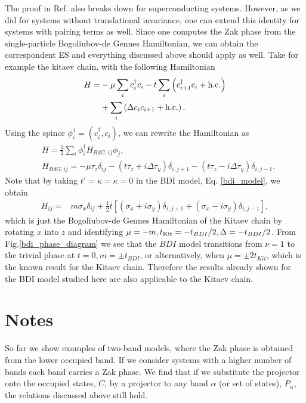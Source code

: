\documentclass[twocolumn,amsmath,longbibliography,amssymb,superscriptaddress]{revtex4-1}
\begin{document}
The proof in Ref.\cite{Zaletel2014} also breaks down for superconducting systems. However, as we did for systems without translational invariance, one can extend this identity for systems with pairing terms as well. Since one computes the Zak phase from the single-particle Bogoliubov-de Gennes Hamiltonian, we can obtain the correspondent ES and everything discussed above should apply as well. Take for example the kitaev chain, with the following Hamiltonian
\begin{align*}
H =& -\mu \sum_{i} c_i^\dagger c_i - t \sum_{i}\left( c_{i+1}^\dagger c_i + {\rm h.c.}\right) \\
&+  \sum_{i}\left( \Delta c_{i} c_{i+1} + {\rm h.c.}\right).
\end{align*}
Using the spinor $\phi_i^\dagger = (c_i^\dagger, c_i)$, we can rewrite the Hamiltonian as
\begin{align*}
&H = \frac{1}{2}\sum_i \phi^\dagger_i H_{BdG,ij} \phi_j,\\
&H_{BdG,ij} = -\mu \tau_z \delta_{ij} - (t \tau_z + i\Delta \tau_y )\delta_{i,j+1}- (t \tau_z - i\Delta \tau_y)\delta_{i,j-1}.
\end{align*}
Note that by taking $t' = \kappa = \kappa = 0$ in the BDI model, Eq. \ref{bdi_model}, we obtain
\begin{align*}
H_{ij} =& m \sigma_x\delta_{ij} + \frac{1}{2} t \left[(\sigma_x + i \sigma_y)\delta_{i,j+1} + (\sigma_x - i \sigma_y) \delta_{i,j-1} \right],
\end{align*}
which is just the Bogoliubov-de Gennes Hamiltonian of the Kitaev chain by rotating $x$ into $z$ and identifying $\mu = -m, t_{\rm Kit} = -t_{BDI}/2, \Delta = -t_{BDI}/2 $. From Fig.\ref{bdi_phase_diagram} we see that the $BDI$ model transitions from $\nu = 1$ to the trivial phase at $t=0, m=\pm t_{BDI}$, or alternatively, when $\mu = \pm 2 t_{Kit}$, which is the known result for the Kitaev chain. Therefore the results already shown for the BDI model studied here are also applicable to the Kitaev chain.  

\section{Notes}

So far we show examples of two-band models, where the Zak phase is obtained from the lower occupied band. If we consider systems with a higher number of bands each band carries a Zak phase. We find that if we substitute the projector onto the occupied states, $C$, by a projector to any band $\alpha$ (or set of states), $P_\alpha$, the relations discussed above still hold.
\end{document}
